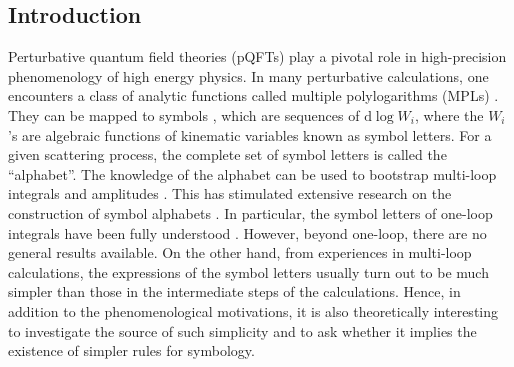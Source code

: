 \documentclass[fleqn]{2023SCGE}
\newcommand{\nd}{\mathrm{d}}
\begin{document}




\maketitle



\begin{multicols}{2}
\section{Introduction}

Perturbative quantum field theories (pQFTs) play a pivotal role in high-precision phenomenology of high energy physics. In many perturbative calculations, one encounters a class of analytic functions called multiple polylogarithms (MPLs) \cite{Chen:1977oja, Goncharov:1998kja}. They can be mapped to symbols \cite{Goncharov:2010jf, Duhr:2011zq}, which are sequences of $\nd \log W_i$, where the $W_i$'s are algebraic functions of kinematic variables known as symbol letters. For a given scattering process, the complete set of symbol letters is called the ``alphabet''. The knowledge of the alphabet can be used to bootstrap multi-loop integrals and amplitudes \cite{Gaiotto:2011dt, Dixon:2011pw, Dixon:2011nj, Brandhuber:2012vm, Dixon:2013eka, Dixon:2014voa, Dixon:2014iba, Drummond:2014ffa, Dixon:2015iva, Caron-Huot:2016owq, Dixon:2016apl, Dixon:2016nkn, Li:2016ctv, Almelid:2017qju, Chicherin:2017dob, Henn:2018cdp, Drummond:2018caf, Caron-Huot:2019vjl, Caron-Huot:2020bkp, Dixon:2020cnr, Dixon:2020bbt, Guo:2021bym, He:2021eec, Dixon:2022rse, Dixon:2022xqh}. This has stimulated extensive research on the construction of symbol alphabets \cite{Caron-Huot:2011dec, Golden:2013xva, Panzer:2014caa, Dennen:2015bet, Caron-Huot:2016owq, Mago:2020kmp, Abreu:2021vhb, Gong:2022erh, Yang:2022gko, He:2021non, He:2021eec, He:2022tph, He:2023qld}.
In particular, the symbol letters of one-loop integrals have been fully understood \cite{Arkani-Hamed:2017ahv, Abreu:2017enx, Abreu:2017mtm, Chen:2022fyw, Dlapa:2023cvx, Jiang:2023qnl}.
{  However, beyond one-loop, there are no general results available.}
On the other hand, from experiences in multi-loop calculations, the expressions of the symbol letters usually turn out to be much simpler than those in the intermediate steps of the calculations. Hence, in addition to the phenomenological motivations, it is also theoretically interesting to investigate the source of such simplicity and to ask whether it implies the existence of simpler rules for symbology.



\end{multicols}
\end{document}

